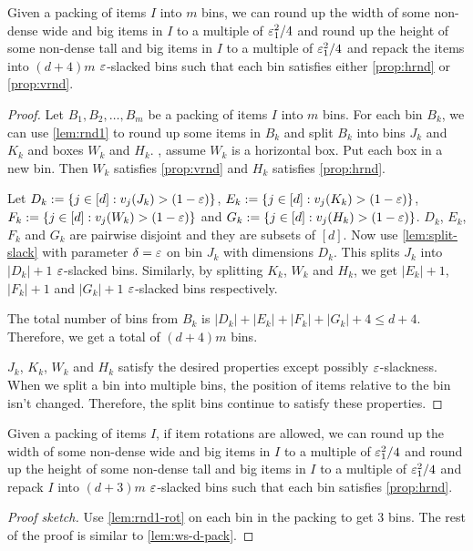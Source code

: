 \begin{lemma}
\label{lem:ws-d-pack}
Given a packing of items $I$ into $m$ bins, we can
round up the width of some non-dense wide and big items in $I$ to a multiple of $\varepsilon_1^2/4$
and round up the height of some non-dense tall and big items in $I$ to a multiple of $\varepsilon_1^2/4$
and repack the items into $(d+4)m$ $\varepsilon$-slacked bins such that
each bin satisfies either \cref{prop:hrnd} or \cref{prop:vrnd}.
\end{lemma}
\begin{proof}
Let $B_1, B_2, \ldots, B_m$ be a packing of items $I$ into $m$ bins.
For each bin $B_k$, we can use \cref{lem:rnd1} to round up some items in $B_k$
and split $B_k$ into bins $J_k$ and $K_k$ and boxes $W_k$ and $H_k$.
\WLoG, assume $W_k$ is a horizontal box. Put each box in a new bin.
Then $W_k$ satisfies \cref{prop:vrnd} and $H_k$ satisfies \cref{prop:hrnd}.

Let $D_k := \{j \in [d]: v_j(J_k) > (1-\varepsilon)\}$,
$E_k := \{j \in [d]: v_j(K_k) > (1-\varepsilon)\}$,
$F_k := \{j \in [d]: v_j(W_k) > (1-\varepsilon)\}$
and $G_k := \{j \in [d]: v_j(H_k) > (1-\varepsilon)\}$.
$D_k$, $E_k$, $F_k$ and $G_k$ are pairwise disjoint and they are subsets of $[d]$.
Now use \cref{lem:split-slack} with parameter $\delta=\varepsilon$ on bin $J_k$
with dimensions $D_k$. This splits $J_k$ into $|D_k| + 1$ $\varepsilon$-slacked bins.
Similarly, by splitting $K_k$, $W_k$ and $H_k$, we get
$|E_k|+1$, $|F_k|+1$ and $|G_k|+1$ $\varepsilon$-slacked bins respectively.

The total number of bins from $B_k$ is $|D_k| + |E_k| + |F_k| + |G_k| + 4 \le d+4$.
Therefore, we get a total of $(d+4)m$ bins.

$J_k$, $K_k$, $W_k$ and $H_k$ satisfy the desired properties except possibly
$\varepsilon$-slackness. When we split a bin into multiple bins, the position of items
relative to the bin isn't changed. Therefore, the split bins continue to satisfy these properties.
\end{proof}

\begin{lemma}
\label{lem:ws-d-pack-rot}
Given a packing of items $I$, if item rotations are allowed, we can
round up the width of some non-dense wide and big items in $I$ to a multiple of $\varepsilon_1^2/4$
and round up the height of some non-dense tall and big items in $I$ to a multiple of $\varepsilon_1^2/4$
and repack $I$ into $(d+3)m$ $\varepsilon$-slacked bins such that
each bin satisfies \cref{prop:hrnd}.
\end{lemma}
\begin{proof}[Proof sketch]
Use \cref{lem:rnd1-rot} on each bin in the packing to get 3 bins.
The rest of the proof is similar to \cref{lem:ws-d-pack}.
\end{proof}

